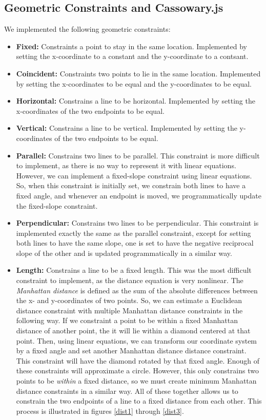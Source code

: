 \subsection*{Geometric Constraints and Cassowary.js}

We implemented the following geometric constraints:

\begin{itemize}
\item {\bf Fixed:} Constraints a point to stay in the same location. Implemented by setting the x-coordinate to a constant and the y-coordinate to a contsant.
\item {\bf Coincident:} Constraints two points to lie in the same location. Implemented by setting the x-coordinates to be equal and the y-coordinates to be equal.
\item {\bf Horizontal:} Constrains a line to be horizontal. Implemented by setting the x-coordinates of the two endpoints to be equal.
\item {\bf Vertical:} Constrains a line to be vertical. Implemented by setting the y-coordinates of the two endpoints to be equal.
\item {\bf Parallel:} Constrains two lines to be parallel. This constraint is more difficult to implement, as there is no way to represent it with linear equations. However, we can implement a fixed-slope constraint using linear equations. So, when this constraint is initially set, we constrain both lines to have a fixed angle, and whenever an endpoint is moved, we programmatically update the fixed-slope constraint.
\item {\bf Perpendicular:} Constrains two lines to be perpendicular. This constraint is implemented exactly the same as the parallel constraint, except for setting both lines to have the same slope, one is set to have the negative reciprocal slope of the other and is updated programmatically in a similar way.
\item {\bf Length:} Constrains a line to be a fixed length. This was the most difficult constraint to implement, as the distance equation is very nonlinear. The {\it Manhattan distance} is defined as the sum of the absolute differences between the x- and y-coordinates of two points. So, we can estimate a Euclidean distance constraint with multiple Manhattan distance constraints in the following way. If we constraint a point to be within a fixed Manhattan distance of another point, the it will lie within a diamond centered at that point. Then, using linear equations, we can transform our coordinate system by a fixed angle and set another Manhattan distance distance constraint. This constraint will have the diamond rotated by that fixed angle. Enough of these constraints will approximate a circle. However, this only constrains two points to be {\it within} a fixed distance, so we must create minimum Manhattan distance constraints in a similar way. All of these together allows us to constrain the two endpoints of a line to a fixed distance from each other. This process is illustrated in figures \ref{dist1} through \ref{dist3}.
\end{itemize}

